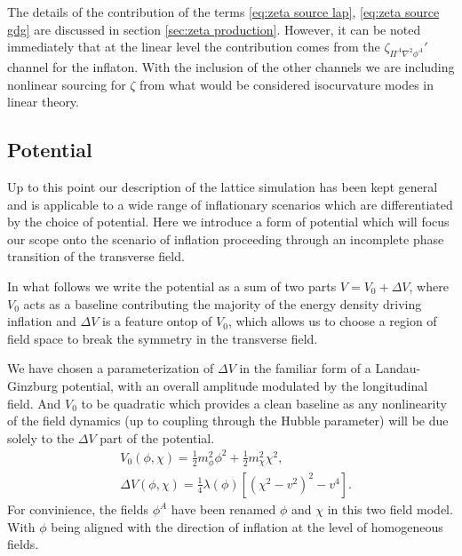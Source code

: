 The details of the contribution of the terms \eqref{eq:zeta source lap}, \eqref{eq:zeta source gdg} are discussed in section \ref{sec:zeta production}. However, it can be noted immediately that at the linear level the contribution comes from the $\zeta_{\Pi^A\nabla^2\phi^A}'$ channel for the inflaton. With the inclusion of the  other channels we are including nonlinear sourcing for $\zeta$ from what would be considered isocurvature modes in linear theory.



\subsection{Potential} \label{sec:potential}
Up to this point our description of the lattice simulation has been kept general and is applicable to a wide range of inflationary scenarios which are differentiated by the choice of potential. Here we introduce a form of potential which will focus our scope onto the scenario of inflation proceeding through an incomplete phase transition of the transverse field. 

In what follows we write the potential as a sum of two parts $V = V_0 + \Delta V$, where $V_0$ acts as a baseline contributing the majority of the energy density driving inflation and $\Delta V$ is a feature ontop of $V_0$, which allows us to choose a region of field space to break the symmetry in the transverse field.

We have chosen a parameterization of $\Delta V$ in the familiar form of a Landau-Ginzburg potential, with an overall amplitude modulated by the longitudinal field. And $V_0$ to be quadratic which provides a clean baseline as any nonlinearity of the field dynamics (up to coupling through the Hubble parameter) will be due solely to the $\Delta V$ part of the potential.
\begin{align}
  &V_0(\phi,\chi) = \frac{1}{2}m^2_\phi\phi^2 + \frac{1}{2}m^2_\chi\chi^2, \label{eq:V0} \\
  &\Delta V(\phi,\chi) = \frac{1}{4}\lambda(\phi)\left[ (\chi^2-v^2)^2 - v^4 \right]. \label{eq:DeltaV}
\end{align}
For convinience, the fields $\phi^A$ have been renamed $\phi$ and $\chi$ in this two field model. With $\phi$ being aligned with the direction of inflation at the level of homogeneous fields.

